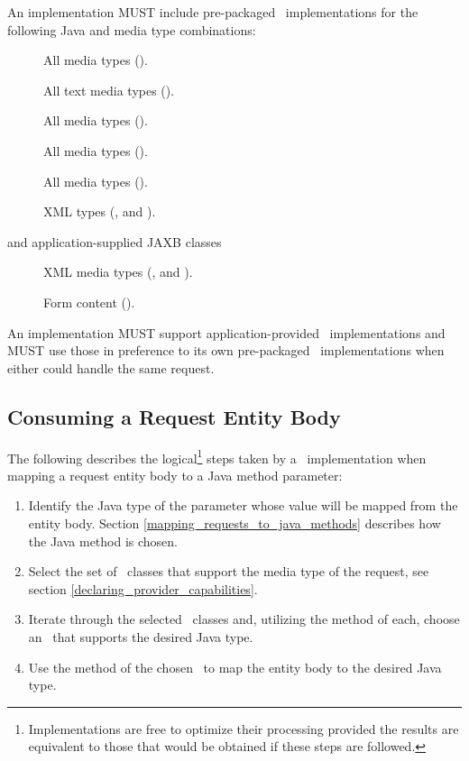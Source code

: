 An implementation MUST include pre-packaged \EntityProvider\ implementations for the following Java and media type combinations:

\begin{description}
\item[] All media types (\code{*/*}).
\item[] All text media types ().
\item[] All media types (\code{*/*}).
\item[] All media types (\code{*/*}).
\item[] All media types (\code{*/*}).
\item[] XML types (,  and ).
\item[ and application-supplied JAXB classes] XML media types (,  and ).
\item[] Form content ().
\end{description}

An implementation MUST support application-provided \EntityProvider\ implementations and MUST use those in preference to its own pre-packaged \EntityProvider\ implementations when either could handle the same request.

\subsection{Consuming a Request Entity Body}

The following describes the logical\footnote{Implementations are free to optimize their processing provided the results are equivalent to those that would be obtained if these steps are followed.} steps taken by a \jaxrs\ implementation when mapping a request entity body to a Java method parameter:

\begin{enumerate}
\item Identify the Java type of the parameter whose value will be mapped from the entity body. Section \ref{mapping_requests_to_java_methods} describes how the Java method is chosen.
\item Select the set of \EntityProvider\ classes that support the media type of the request, see section \ref{declaring_provider_capabilities}.
\item Iterate through the selected \EntityProvider\ classes and, utilizing the  method of each, choose an \EntityProvider\ that supports the desired Java type.
\item Use the  method of the chosen \EntityProvider\ to map the entity body to the desired Java type.
\end{enumerate}

